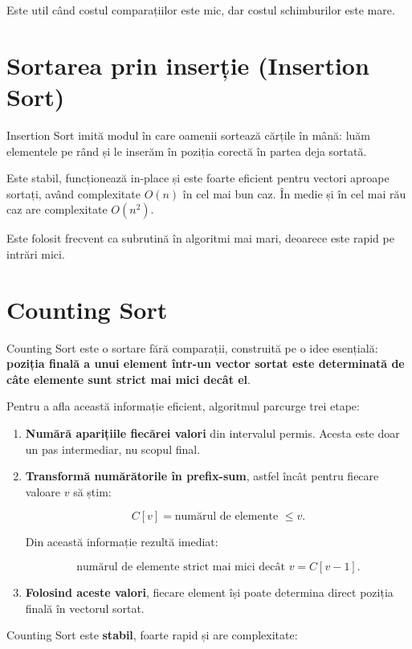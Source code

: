 \documentclass[12pt]{article}
\begin{document}
Este util când costul comparațiilor este mic, dar costul schimburilor este mare.

\section{Sortarea prin inserție (Insertion Sort)}

Insertion Sort imită modul în care oamenii sortează cărțile în mână: luăm
elementele pe rând și le inserăm în poziția corectă în partea deja sortată.

Este stabil, funcționează in-place și este foarte eficient pentru vectori aproape
sortați, având complexitate $O(n)$ în cel mai bun caz. În medie și în cel mai rău
caz are complexitate $O(n^2)$.

Este folosit frecvent ca subrutină în algoritmi mai mari, deoarece este rapid pe
intrări mici.

\section{Counting Sort}

Counting Sort este o sortare fără comparații, construită pe o idee esențială:
\textbf{poziția finală a unui element într-un vector sortat este determinată de câte elemente sunt strict mai mici decât el}.

Pentru a afla această informație eficient, algoritmul parcurge trei etape:

\begin{enumerate}
    \item \textbf{Numără aparițiile fiecărei valori} din intervalul permis. 
    Acesta este doar un pas intermediar, nu scopul final.

    \item \textbf{Transformă numărătorile în prefix-sum}, astfel încât pentru fiecare valoare $v$ să știm:
    

\[
    C[v] = \text{numărul de elemente } \le v.
    \]


    Din această informație rezultă imediat:
    

\[
    \text{numărul de elemente strict mai mici decât } v = C[v-1].
    \]



    \item \textbf{Folosind aceste valori}, fiecare element își poate determina direct poziția finală în vectorul sortat.
\end{enumerate}

Counting Sort este \textbf{stabil}, foarte rapid și are complexitate:
\end{document}
